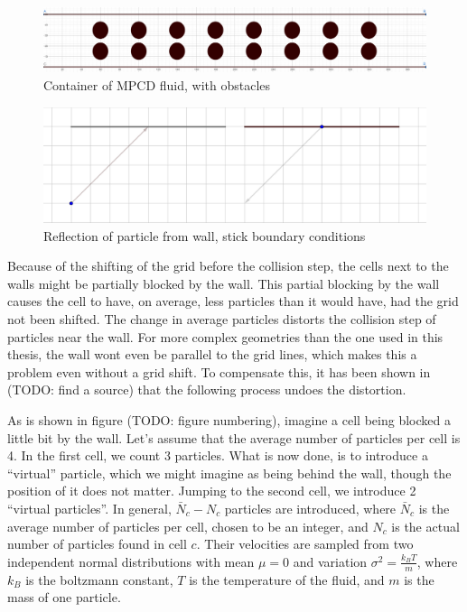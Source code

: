 \documentclass[
]{article}
\begin{document}
\begin{figure}
\centering
\includegraphics{Assets/MPCD_Pipe.png}
\caption{Container of MPCD fluid, with obstacles}
\end{figure}

\begin{figure}
\centering
\includegraphics{Assets/Wall_stick_boundary_conditions_reflection.png}
\caption{Reflection of particle from wall, stick boundary conditions}
\end{figure}

Because of the shifting of the grid before the collision step, the cells
next to the walls might be partially blocked by the wall. This partial
blocking by the wall causes the cell to have, on average, less particles
than it would have, had the grid not been shifted. The change in average
particles distorts the collision step of particles near the wall. For
more complex geometries than the one used in this thesis, the wall wont
even be parallel to the grid lines, which makes this a problem even
without a grid shift. To compensate this, it has been shown in (TODO:
find a source) that the following process undoes the distortion.

As is shown in figure (TODO: figure numbering), imagine a cell being
blocked a little bit by the wall. Let's assume that the average number
of particles per cell is 4. In the first cell, we count 3 particles.
What is now done, is to introduce a ``virtual'' particle, which we might
imagine as being behind the wall, though the position of it does not
matter. Jumping to the second cell, we introduce 2 ``virtual
particles''. In general, \(\bar N_c - N_c\) particles are introduced,
where \(\bar N_c\) is the average number of particles per cell, chosen
to be an integer, and \(N_c\) is the actual number of particles found in
cell \(c\). Their velocities are sampled from two independent normal
distributions with mean \(\mu = 0\) and variation
\(\sigma^2 = \frac{k_{B}T}{m}\), where \(k_{B}\) is the boltzmann
constant, \(T\) is the temperature of the fluid, and \(m\) is the mass
of one particle.
\end{document}
